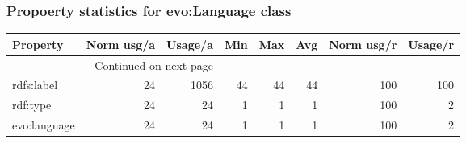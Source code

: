 \documentclass[10pt,a4paper,titlepage,final]{article}
\begin{document}
\subsubsection{Propoerty statistics for evo:Language class}
\begin{longtable}{lrrrrrrr}
\toprule
     Property &  Norm usg/a &  Usage/a &  Min &  Max &  Avg &  Norm usg/r &  Usage/r \\
\midrule
\endhead
\midrule
\multicolumn{3}{r}{{Continued on next page}} \\
\midrule
\endfoot

\bottomrule
\endlastfoot
   rdfs:label &          24 &     1056 &   44 &   44 &   44 &         100 &      100 \\
     rdf:type &          24 &       24 &    1 &    1 &    1 &         100 &        2 \\
 evo:language &          24 &       24 &    1 &    1 &    1 &         100 &        2 \\
\end{longtable}
\end{document}
